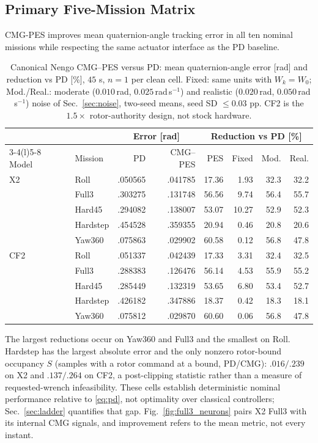 \documentclass[letterpaper, 10 pt, conference]{ieeeconf}
\begin{document}
\subsection{Primary Five-Mission Matrix}
CMG-PES improves mean quaternion-angle tracking error in all ten nominal missions while respecting the same actuator interface as the PD baseline.
%
\begin{table}[h]
\caption{Canonical Nengo CMG--PES versus PD: mean quaternion-angle error
[rad] and reduction vs PD [\%], $45$ s, $n=1$ per clean cell. Fixed: same
units with $W_k=W_0$; Mod./Real.: moderate ($0.010$\,rad,
$0.025$\,rad\,s$^{-1}$) and realistic ($0.020$\,rad, $0.050$\,rad\,s$^{-1}$)
noise of Sec.~\ref{sec:noise}, two-seed means, seed SD $\le0.03$ pp. CF2 is
the $1.5\times$ rotor-authority design, not stock hardware.}
\label{tab:mujoco}\label{tab:noise}\centering\scriptsize
\setlength{\tabcolsep}{2.4pt}
\begin{tabular}{@{}llrrrrrr@{}}
\toprule
&&\multicolumn{2}{c}{Error [rad]}&\multicolumn{4}{c}{Reduction vs PD [\%]}\\
\cmidrule(lr){3-4}\cmidrule(l){5-8}
Model&Mission&PD&CMG--PES&PES&Fixed&Mod.&Real.\\\midrule
X2&Roll&.050565&.041785&17.36&1.93&32.3&32.2\\
&Full3&.303275&.131748&56.56&9.74&56.4&55.7\\
&Hard45&.294082&.138007&53.07&10.27&52.9&52.3\\
&Hardstep&.454528&.359355&20.94&0.46&20.8&20.6\\
&Yaw360&.075863&.029902&60.58&0.12&56.8&47.8\\\midrule
CF2&Roll&.051337&.042439&17.33&3.31&32.4&32.5\\
&Full3&.288383&.126476&56.14&4.53&55.9&55.2\\
&Hard45&.285449&.132319&53.65&6.80&53.4&52.7\\
&Hardstep&.426182&.347886&18.37&0.42&18.3&18.1\\
&Yaw360&.075812&.029870&60.60&0.06&56.8&47.8\\\bottomrule
\end{tabular}
\end{table}
%
The largest reductions occur on Yaw360 and Full3 and the smallest on Roll.
Hardstep has the largest absolute error and the only nonzero rotor-bound
occupancy $S$ (samples with a rotor command at a bound, PD/CMG):
$.016/.239$ on X2 and $.137/.264$ on CF2, a post-clipping statistic rather
than a measure of requested-wrench infeasibility. These cells establish
deterministic nominal performance relative to \eqref{eq:pd}, not optimality
over classical controllers; Sec.~\ref{sec:ladder} quantifies that gap.
Fig.~\ref{fig:full3_neurons} pairs X2 Full3 with its internal CMG signals,
and improvement refers to the mean metric, not every instant.
\end{document}
